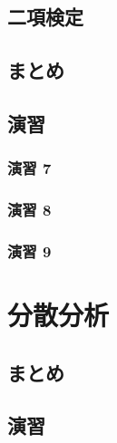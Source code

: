 \documentclass[
  12pt,
]{book}
\begin{document}
\hypertarget{ux4e8cux9805ux691cux5b9a}{%
\subsection{二項検定}\label{ux4e8cux9805ux691cux5b9a}}

\hypertarget{ux307eux3068ux3081-3}{%
\subsection{まとめ}\label{ux307eux3068ux3081-3}}

\hypertarget{ux6f14ux7fd2-7}{%
\subsection{演習}\label{ux6f14ux7fd2-7}}

\hypertarget{ux6f14ux7fd2-7-1}{%
\subsubsection*{演習 7}\label{ux6f14ux7fd2-7-1}}

\hypertarget{ux6f14ux7fd2-8}{%
\subsubsection*{演習 8}\label{ux6f14ux7fd2-8}}

\hypertarget{ux6f14ux7fd2-9}{%
\subsubsection*{演習 9}\label{ux6f14ux7fd2-9}}

\hypertarget{ux5206ux6563ux5206ux6790}{%
\section{分散分析}\label{ux5206ux6563ux5206ux6790}}

\hypertarget{ux307eux3068ux3081-4}{%
\subsection{まとめ}\label{ux307eux3068ux3081-4}}

\hypertarget{ux6f14ux7fd2-10}{%
\subsection{演習}\label{ux6f14ux7fd2-10}}
\end{document}
